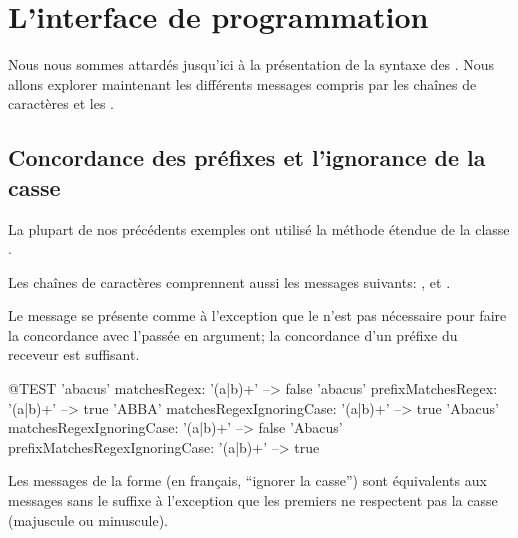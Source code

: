 \documentclass[a4paper,10pt,twoside]{book}
\begin{document}
\section{L'interface de programmation \pkgregex}

Nous nous sommes attardés jusqu'ici à la présentation de la syntaxe
des \expregs. Nous allons explorer maintenant les différents messages
compris par les chaînes de caractères et les \expregs.

\subsection{Concordance des préfixes et l'ignorance de la casse}

La plupart de nos précédents exemples ont utilisé la méthode étendue
 de la classe .

Les chaînes de caractères comprennent aussi les messages suivants:
,  et
\mbox{.}

Le message  se présente comme
 à l'exception que le 
n'est pas nécessaire pour faire la concordance avec l'\expreg passée
en argument; la concordance d'un préfixe du receveur est suffisant.
\begin{code}{@TEST}
'abacus' matchesRegex: '(a|b)+'                                --> false
'abacus' prefixMatchesRegex: '(a|b)+'                       --> true
'ABBA' matchesRegexIgnoringCase: '(a|b)+'            --> true
'Abacus' matchesRegexIgnoringCase: '(a|b)+'          --> false
'Abacus' prefixMatchesRegexIgnoringCase: '(a|b)+' --> true
\end{code}

Les messages de la forme  (en français,
  ``ignorer la casse'') sont équivalents aux messages sans le suffixe
  à l'exception que les premiers ne respectent pas la casse (majuscule
ou minuscule).
\end{document}
